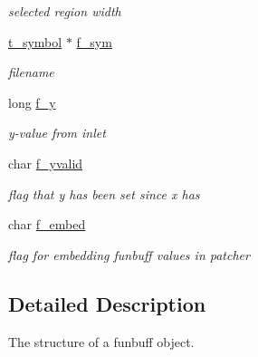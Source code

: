 \begin{DoxyCompactItemize}
\begin{DoxyCompactList}\small\item\em selected region width \item\end{DoxyCompactList}\item 
\hypertarget{structt__funbuff_ab1688f78d88472a4aef61b971d5f12f1}{
\hyperlink{structt__symbol}{t\_\-symbol} $\ast$ \hyperlink{structt__funbuff_ab1688f78d88472a4aef61b971d5f12f1}{f\_\-sym}}
\label{structt__funbuff_ab1688f78d88472a4aef61b971d5f12f1}

\begin{DoxyCompactList}\small\item\em filename \item\end{DoxyCompactList}\item 
\hypertarget{structt__funbuff_a8752ceb5bdcd719ad4a180dc5ce87dea}{
long \hyperlink{structt__funbuff_a8752ceb5bdcd719ad4a180dc5ce87dea}{f\_\-y}}
\label{structt__funbuff_a8752ceb5bdcd719ad4a180dc5ce87dea}

\begin{DoxyCompactList}\small\item\em y-\/value from inlet \item\end{DoxyCompactList}\item 
\hypertarget{structt__funbuff_aa7b18ab85d729173ee157ced866ecee1}{
char \hyperlink{structt__funbuff_aa7b18ab85d729173ee157ced866ecee1}{f\_\-yvalid}}
\label{structt__funbuff_aa7b18ab85d729173ee157ced866ecee1}

\begin{DoxyCompactList}\small\item\em flag that y has been set since x has \item\end{DoxyCompactList}\item 
\hypertarget{structt__funbuff_a5ca2cfd0987ac4148df28877ba24964b}{
char \hyperlink{structt__funbuff_a5ca2cfd0987ac4148df28877ba24964b}{f\_\-embed}}
\label{structt__funbuff_a5ca2cfd0987ac4148df28877ba24964b}

\begin{DoxyCompactList}\small\item\em flag for embedding funbuff values in patcher \item\end{DoxyCompactList}\end{DoxyCompactItemize}


\subsection{Detailed Description}
The structure of a funbuff object. 
